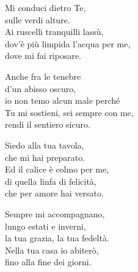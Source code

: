 

\spazio

\strofa Mi conduci dietro Te,\\
sulle verdi alture.\\
Ai ruscelli tranquilli lassù,\\
dov'è più limpida l'acqua per me,\\
dove mi fai riposare.

\spazio


\spazio

\strofa Anche fra le tenebre\\
d'un abisso oscuro,\\
io non temo alcun male perché\\
Tu mi sostieni, sei sempre con me,\\
rendi il sentiero sicuro.

\spazio


\spazio

\strofa Siedo alla tua tavola,\\
che mi hai preparato.\\
Ed il calice è colmo per me,\\
di quella linfa di felicità,\\
che per amore hai versato.

\spazio


\spazio

\strofa Sempre mi accompagnano,\\
lungo estati e inverni,\\
la tua grazia, la tua fedeltà.\\
Nella tua casa io abiterò,\\
fino alla fine dei giorni.

\spazio

